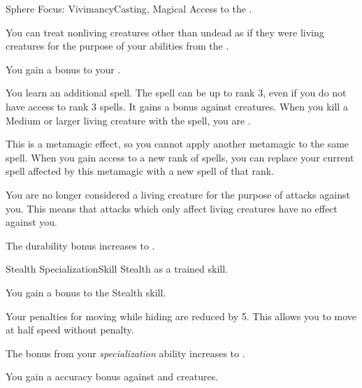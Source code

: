  \begin{magicalfeat}{Sphere Focus: Vivimancy}{Casting, Magical}
    \featpre Access to the  .

     You can treat nonliving creatures other than undead as if they were living creatures for the purpose of your abilities from the  .

     You gain a  bonus to your .

     You learn an additional spell.
    The spell can be up to rank 3, even if you do not have access to rank 3 spells.
    It gains a   bonus against  creatures.
    When you kill a Medium or larger living creature with the spell, you are  \empowered.

    This is a metamagic effect, so you cannot apply another metamagic to the same spell.
    When you gain access to a new rank of spells, you can replace your current spell affected by this metamagic with a new spell of that rank.

     You are no longer considered a living creature for the purpose of attacks against you.
    This means that attacks which only affect living creatures have no effect against you.

     The durability bonus increases to .
  \end{magicalfeat}

  \begin{feat}{Stealth Specialization}{Skill}
    \featpre Stealth as a trained skill.

     You gain a  bonus to the Stealth skill.

     Your penalties for moving while hiding are reduced by 5.
    This allows you to move at half speed without penalty.

     The bonus from your \textit{specialization} ability increases to .

     You gain a  accuracy bonus against \unaware and \partiallyunaware creatures.
  \end{feat}

